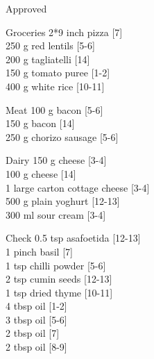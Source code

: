 \begin{menu}{Approved}
\begin{shoppinglist}{Groceries}
      2*9 inch pizza 
        {\scriptsize[7]}\\
      250 g red lentils 
        {\scriptsize[5-6]}\\
      200 g tagliatelli 
        {\scriptsize[14]}\\
      150 g tomato puree 
        {\scriptsize[1-2]}\\
      400 g white rice 
        {\scriptsize[10-11]}\\
      \end{shoppinglist}%
      \par\vfil %
      \begin{shoppinglist}{Meat}
      100 g bacon 
        {\scriptsize[5-6]}\\
      150 g bacon 
        {\scriptsize[14]}\\
      250 g chorizo sausage 
        {\scriptsize[5-6]}\\
      \end{shoppinglist}%
      \begin{shoppinglist}{Dairy}
      150 g cheese 
        {\scriptsize[3-4]}\\
      100 g cheese 
        {\scriptsize[14]}\\
      1 large carton cottage cheese 
        {\scriptsize[3-4]}\\
      500 g plain yoghurt 
        {\scriptsize[12-13]}\\
      300 ml sour cream 
        {\scriptsize[3-4]}\\
      \end{shoppinglist}%
      \par\vfil %
      \vfil\clearpage %
      \begin{shoppinglist}{Check}
      0.5 tsp asafoetida 
        {\scriptsize[12-13]}\\
      1 pinch basil 
        {\scriptsize[7]}\\
      1 tsp chilli powder 
        {\scriptsize[5-6]}\\
      2 tsp cumin seeds 
        {\scriptsize[12-13]}\\
      1 tsp dried thyme 
        {\scriptsize[10-11]}\\
      4 tbsp oil 
        {\scriptsize[1-2]}\\
      3 tbsp oil 
        {\scriptsize[5-6]}\\
      2 tbsp oil 
        {\scriptsize[7]}\\
      2 tbsp oil 
        {\scriptsize[8-9]}\\

\end{shoppinglist}
\end{menu}
